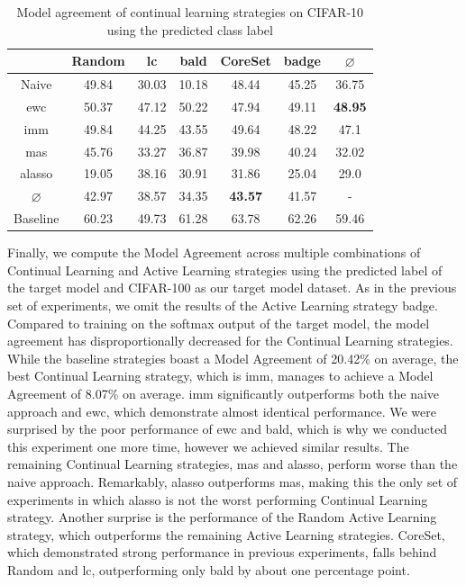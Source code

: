 \begin{table}[h]
    \centering
    \begin{tabular}{ c | c c c c c | c } 
         & Random & \gls{lc} & \gls{bald} & CoreSet & \gls{badge} & $\varnothing$\\ 
        \hline
        Naive & 49.84 & 30.03 & 10.18 & 48.44 & 45.25 & 36.75\\
        \gls{ewc} & 50.37 & 47.12 & 50.22 & 47.94 & 49.11 & \textbf{48.95} \\
        \gls{imm} & 49.84 & 44.25 & 43.55 & 49.64 & 48.22 & 47.1\\
        \gls{mas} & 45.76 & 33.27 & 36.87 & 39.98 & 40.24 & 32.02\\
        \gls{alasso} & 19.05 & 38.16 & 30.91 & 31.86 & 25.04 & 29.0\\
        \hline
        $\varnothing$ & 42.97 & 38.57 & 34.35 & \textbf{43.57} & 41.57 & -\\
        Baseline & 60.23 & 49.73 & 61.28 & 63.78 & 62.26 & 59.46\\
    \end{tabular}
    \caption{Model agreement of continual learning strategies on CIFAR-10 using the predicted class label}
    \label{fig:ModelStealingCIFAR10Label}
\end{table}


Finally, we compute the Model Agreement across multiple combinations of Continual Learning and Active Learning strategies using the predicted label of the target
model and CIFAR-100 as our target model dataset. As in the previous set of experiments, we omit the results of the Active Learning strategy \gls{badge}. Compared
to training on the softmax output of the target model, the model agreement has disproportionally decreased for the Continual Learning strategies. While the
baseline strategies boast a Model Agreement of 20.42\% on average, the best Continual Learning strategy, which is \gls{imm}, manages to achieve a Model Agreement
of 8.07\% on average. \gls{imm} significantly outperforms both the naive approach and \gls{ewc}, which demonstrate almost identical performance. We were surprised
by the poor performance of \gls{ewc} and \gls{bald}, which is why we conducted this experiment one more time, however we achieved similar results. The remaining
Continual Learning strategies, \gls{mas} and \gls{alasso}, perform worse than the naive approach. Remarkably, \gls{alasso} outperforms \gls{mas}, making this the
only set of experiments in which \gls{alasso} is not the worst performing Continual Learning strategy. Another surprise is the performance of the Random Active
Learning strategy, which outperforms the remaining Active Learning strategies. CoreSet, which demonstrated strong performance in previous experiments, falls behind
Random and \gls{lc}, outperforming only \gls{bald} by about one percentage point. \par

